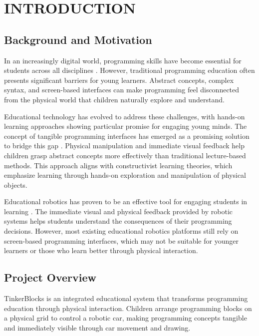 \chapter{INTRODUCTION}

\section{Background and Motivation}

In an increasingly digital world, programming skills have become essential for students across all disciplines \cite{wing2006computational}. However, traditional programming education often presents significant barriers for young learners. Abstract concepts, complex syntax, and screen-based interfaces can make programming feel disconnected from the physical world that children naturally explore and understand.

Educational technology has evolved to address these challenges, with hands-on learning approaches showing particular promise for engaging young minds. The concept of tangible programming interfaces has emerged as a promising solution to bridge this gap \cite{ishii2008tangible}. Physical manipulation and immediate visual feedback help children grasp abstract concepts more effectively than traditional lecture-based methods. This approach aligns with constructivist learning theories, which emphasize learning through hands-on exploration and manipulation of physical objects.

Educational robotics has proven to be an effective tool for engaging students in learning \cite{benitti2012exploring}. The immediate visual and physical feedback provided by robotic systems helps students understand the consequences of their programming decisions. However, most existing educational robotics platforms still rely on screen-based programming interfaces, which may not be suitable for younger learners or those who learn better through physical interaction.

\section{Project Overview}

TinkerBlocks is an integrated educational system that transforms programming education through physical interaction. Children arrange programming blocks on a physical grid to control a robotic car, making programming concepts tangible and immediately visible through car movement and drawing.


